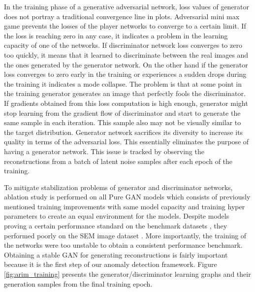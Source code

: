 In the training phase of a generative adversarial network, loss values of generator does not
portray a traditional convergence line in plots. Adversarial mini max game prevents the losses of the
player networks to converge to a certain limit. If the loss is reaching zero in any case, it
indicates a problem in the learning capacity of one of the networks. If discriminator network loss converges
to zero too quickly, it means that it learned to discriminate between the real images and the ones
generated by the generator network. On the other hand if the generator loss converges to zero early
in the training or experiences a sudden drops during the training it indicates a mode collapse. 
The problem is that at some point in the training generator generates an image that
perfectly fools the discriminator. If gradients obtained from this loss computation is high enough,
generator might stop learning from the gradient flow of discriminator and start to generate the same
sample in each iteration. This sample also may not be visually similar to the target distribution. Generator network 
sacrifices its diversity to increase its quality in terms of the adversarial loss.  
This essentially eliminates the purpose of having a generator network. This issue is 
tracked by observing the reconstructions from a batch of latent noise samples after each epoch of the 
training. 

To mitigate stabilization problems of generator and discriminator networks, ablation study is 
performed on all Pure GAN models which consists of previously mentioned training improvements with 
same model capacity and training hyper parameters to create an equal environment for the models. 
Despite models proving a certain performance standard on the benchmark datasets \cite{cifar10,Netzer2011ReadingDI}, 
they performed poorly on the SEM image dataset \cite{sem}. More importantly, the training of 
the networks were too unstable to obtain a consistent performance benchmark. Obtaining a stable 
GAN for generating reconstructions is fairly important because it is the first step of our anomaly 
detection framework. Figure \ref{fig:arim_training} presents the generator/discriminator learning 
graphs and their generation samples from the final training epoch.

